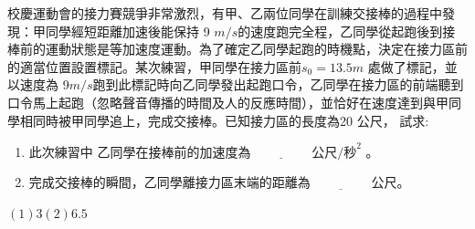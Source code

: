 \documentclass[cn,10pt,math=newtx]{elegantbook}
\begin{document}
\begin{example}
   校慶運動會的接力賽競爭非常激烈，有甲、乙兩位同學在訓練交接棒的過程中發現：甲同學經短距離加速後能保持 9 $m/s$的速度跑完全程，乙同學從起跑後到接棒前的運動狀態是等加速度運動。為了確定乙同學起跑的時機點，決定在接力區前的適當位置設置標記。某次練習，甲同學在接力區前$s_0=13.5m$ 處做了標記，並以速度為 9$m/s$跑到此標記時向乙同學發出起跑口令，乙同學在接力區的前端聽到口令馬上起跑（忽略聲音傳播的時間及人的反應時間），並恰好在速度達到與甲同學相同時被甲同學追上，完成交接棒。已知接力區的長度為20 公尺， 試求:
\begin{enumerate}[label=(\arabic*)] 
  \item 此次練習中 乙同學在接棒前的加速度為$\underline{\hspace{2cm}} 公尺/秒^2$ 。
  \item 完成交接棒的瞬間，乙同學離接力區末端的距離為$\underline{\hspace{2cm}} $公尺。
    \end{enumerate}
   
   
    \rightline{[復興高中教甄109]}
\end{example}
\begin{solution}
    $(1) 3  (2) 6.5$
\end{solution}

\newpage
\end{document}
